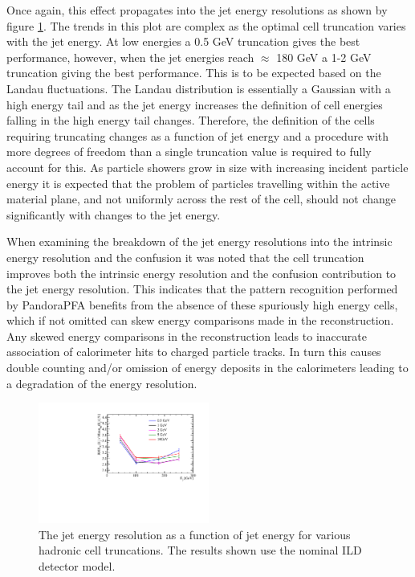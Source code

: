 Once again, this effect propagates into the jet energy resolutions as shown by figure \ref{fig:jercelltrunc}.  The trends in this plot are complex as the optimal cell truncation varies with the jet energy.  At low energies a 0.5 GeV truncation gives the best performance, however, when the jet energies reach $\approx$ 180 GeV a 1-2 GeV truncation giving the best performance.  This is to be expected based on the Landau fluctuations.  The Landau distribution is essentially a Gaussian with a high energy tail and as the jet energy increases the definition of cell energies falling in the high energy tail changes.  Therefore, the definition of the cells requiring truncating changes as a function of jet energy and a procedure with more degrees of freedom than a single truncation value is required to fully account for this.  As particle showers grow in size with increasing incident particle energy it is expected that the problem of particles travelling within the active material plane, and not uniformly across the rest of the cell, should not change significantly with changes to the jet energy.  

When examining the breakdown of the jet energy resolutions into the intrinsic energy resolution and the confusion it was noted that the cell truncation improves both the intrinsic energy resolution and the confusion contribution to the jet energy resolution.  This indicates that the pattern recognition performed by PandoraPFA benefits from the absence of these spuriously high energy cells, which if not omitted can skew energy comparisons made in the reconstruction.  Any skewed energy comparisons in the reconstruction leads to inaccurate association of calorimeter hits to charged particle tracks.  In turn this causes double counting and/or omission of energy deposits in the calorimeters leading to a degradation of the energy resolution.  

\begin{figure}
\includegraphics[width=0.5\textwidth]{EnergyEstimators/Plots/CellTruncation/JER_vs_JetEnergy_HCalCellTruncation.pdf}
\caption[The jet energy resolution as a function of jet energy for various hadronic cell truncations.  The results shown use the nominal ILD detector model.]{The jet energy resolution as a function of jet energy for various hadronic cell truncations.  The results shown use the nominal ILD detector model.}
\label{fig:jercelltrunc}
\end{figure}


